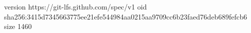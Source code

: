version https://git-lfs.github.com/spec/v1
oid sha256:3415d7345663775ee21efe544984aa0215aa9709cc6b23faed76deb689fefcb6
size 1460
